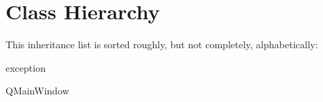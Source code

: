 \section{Class Hierarchy}
This inheritance list is sorted roughly, but not completely, alphabetically\+:\begin{DoxyCompactList}
\item {}
\item {}
\item exception\begin{DoxyCompactList}
\item {}
\end{DoxyCompactList}
\item Q\+Main\+Window\begin{DoxyCompactList}
\item {}
\end{DoxyCompactList}
\end{DoxyCompactList}
